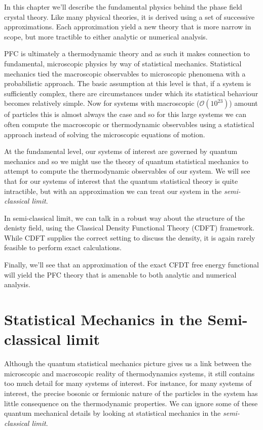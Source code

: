 In this chapter we'll describe the fundamental physics behind the phase field crystal theory.
Like many physical theories, it is derived using a set of successive approximations.
Each approximation yield a new theory that is more narrow in scope, but more tractible to either analytic or numerical analysis.

PFC is ultimately a thermodynamic theory and as such it makes connection to fundamental, microscopic physics by way of statistical mechanics.
Statistical mechanics tied the macroscopic observables to microscopic phenomena with a probabilistic approach.
The basic assumption at this level is that, if a system is sufficiently complex, there are circumstances under which its statistical behaviour becomes relatively simple.
Now for systems with macroscopic ($\mathcal{O}(10^{23})$) amount of particles this is almost always the case and so for this large systems we can often compute the macroscopic or thermodynamic observables using a statistical approach instead of solving the microscopic equations of motion.

At the fundamental level, our systems of interest are governed by quantum mechanics and so we might use the theory of quantum statistical mechanics to attempt to compute the thermodynamic observables of our system.
We will see that for our systems of interest that the quantum statistical theory is quite intractible, but with an approximation we can treat our system in the \textit{semi-classical limit}.

In semi-classical limit, we can talk in a robust way about the structure of the denisty field, using the Classical Density Functional Theory (CDFT) framework.
While CDFT supplies the correct setting to discuss the density, it is again rarely feasible to perform exact calculations.

Finally, we'll see that an approximation of the exact CFDT free energy functional will yield the PFC theory that is amenable to both analytic and numerical analysis.

\section{Statistical Mechanics in the Semi-classical limit} %

Although the quantum statistical mechanics picture gives us a link between the microscopic and macroscopic reality of thermodynamics systems, it still contains too much detail for many systems of interest.
For instance, for many systems of interest, the precise bosonic or fermionic nature of the particles in the system has little consequence on the thermodynamic properties.
We can ignore some of these quantum mechanical details by looking at statistical mechanics in the \textit{semi-classical limit}.

